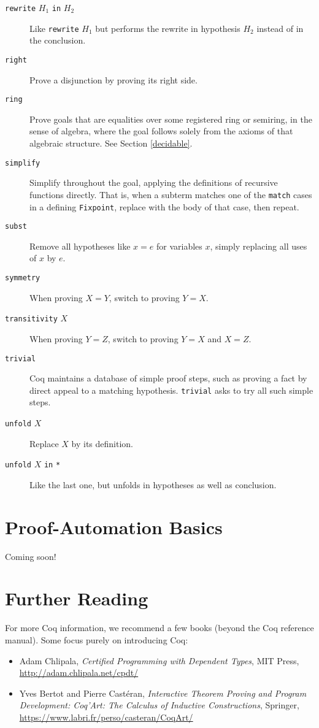 \documentclass{amsbook}
\theoremstyle{definition}
\theoremstyle{remark}
\numberwithin{section}{chapter}
\numberwithin{equation}{chapter}
\begin{document}
\begin{description}
  \item[\texttt{rewrite} $H_1$ \texttt{in} $H_2$] Like \texttt{rewrite} $H_1$ but performs the rewrite in hypothesis $H_2$ instead of in the conclusion.
  \item[\texttt{right}] Prove a disjunction by proving its right side.
  \item[\texttt{ring}] Prove goals that are equalities over some registered ring or semiring, in the sense of algebra, where the goal follows solely from the axioms of that algebraic structure.  See Section \ref{decidable}.
  \item[\texttt{simplify}] Simplify throughout the goal, applying the definitions of recursive functions directly.  That is, when a subterm matches one of the \texttt{match} cases in a defining \texttt{Fixpoint}, replace with the body of that case, then repeat.
  \item[\texttt{subst}] Remove all hypotheses like $x = e$ for variables $x$, simply replacing all uses of $x$ by $e$.
  \item[\texttt{symmetry}] When proving $X = Y$, switch to proving $Y = X$.
  \item[\texttt{transitivity} $X$] When proving $Y = Z$, switch to proving $Y = X$ and $X = Z$.
  \item[\texttt{trivial}] Coq maintains a database of simple proof steps, such as proving a fact by direct appeal to a matching hypothesis.  \texttt{trivial} asks to try all such simple steps.
  \item[\texttt{unfold} $X$] Replace $X$ by its definition.
  \item[\texttt{unfold} $X$ \texttt{in} \texttt{*}] Like the last one, but unfolds in hypotheses as well as conclusion.
\end{description}

\section{Proof-Automation Basics}

Coming soon!

\section{Further Reading}

For more Coq information, we recommend a few books (beyond the Coq reference manual).  Some focus purely on introducing Coq:

\begin{itemize}
  \item Adam Chlipala, \emph{Certified Programming with Dependent Types}, MIT Press, \url{http://adam.chlipala.net/cpdt/}
  \item Yves Bertot and Pierre Cast\'eran, \emph{Interactive Theorem Proving and Program Development: Coq'Art: The Calculus of Inductive Constructions}, Springer, \url{https://www.labri.fr/perso/casteran/CoqArt/}
\end{itemize}
\end{document}
